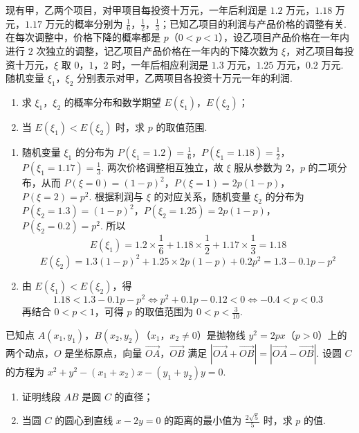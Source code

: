 \begin{problem}
现有甲，乙两个项目，对甲项目每投资十万元，一年后利润是 \(1.2\) 万元，\(1.18\) 万元，\(1.17\) 万元的概率分别为 \(\frac{1}{6}\)，\(\frac{1}{2}\)，\(\frac{1}{3}\)；已知乙项目的利润与产品价格的调整有关. 在每次调整中，价格下降的概率都是 \(p\)（\(0 < p < 1\)），设乙项目产品价格在一年内进行 \(2\) 次独立的调整，记乙项目产品价格在一年内的下降次数为 \(\xi\)，对乙项目每投资十万元，\(\xi\) 取 \(0\)，\(1\)，\(2\) 时，一年后相应利润是 \(1.3\) 万元，\(1.25\) 万元，\(0.2\) 万元. 随机变量 \(\xi_1\)，\(\xi_2\) 分别表示对甲，乙两项目各投资十万元一年的利润.

\begin{enumerate}
\item 求 \( \xi_1 \)，\( \xi_2 \) 的概率分布和数学期望 \( E(\xi_1) \)，\( E(\xi_2) \)；
\item 当 \( E(\xi_1) < E(\xi_2) \) 时，求 \(p\) 的取值范围.
\end{enumerate}
\end{problem}

\begin{solution}
\begin{enumerate}
\item 随机变量 \(\xi_1\) 的分布为
\(P(\xi_1=1.2)=\frac{1}{6}\)，\(P(\xi_1=1.18)=\frac{1}{2}\)，\(P(\xi_1=1.17)=\frac{1}{3}\).
两次价格调整相互独立，故 \(\xi\) 服从参数为 \(2\)，\(p\) 的二项分布，从而
\(P(\xi=0)=(1-p)^2\)，\(P(\xi=1)=2p(1-p)\)，\(P(\xi=2)=p^2\).
根据利润与 \(\xi\) 的对应关系，随机变量 \(\xi_2\) 的分布为
\(P(\xi_2=1.3)=(1-p)^2\)，\(P(\xi_2=1.25)=2p(1-p)\)，\(P(\xi_2=0.2)=p^2\).
所以
\[
E(\xi_1)=1.2\times\frac{1}{6}+1.18\times\frac{1}{2}+1.17\times\frac{1}{3}=1.18
\]
\[
E(\xi_2)=1.3(1-p)^2+1.25\times2p(1-p)+0.2p^2=1.3-0.1p-p^2
\]

\item 由 \(E(\xi_1)<E(\xi_2)\)，得
\[
1.18<1.3-0.1p-p^2
\Longleftrightarrow p^2+0.1p-0.12<0
\Longleftrightarrow -0.4<p<0.3
\]
再结合 \(0<p<1\)，可得 \(p\) 的取值范围为 \(0<p<\frac{3}{10}\).
\end{enumerate}
\end{solution}

\begin{problem}
已知点 \(A(x_{1},y_{1})\)，\(B(x_{2},y_{2})\)（\(x_{1}\)，\(x_{2}\neq 0\)）是抛物线 \(y^{2} = 2px\)（\(p > 0\)）上的两个动点，\(O\) 是坐标原点，向量 \(\overrightarrow{OA}\)，\(\overrightarrow{OB}\) 满足 \(\left|\overrightarrow{OA} +\overrightarrow{OB}\right| = \left|\overrightarrow{OA} -\overrightarrow{OB}\right|\). 设圆 \(C\) 的方程为 \(x^{2} + y^{2} - (x_{1} + x_{2})x - (y_{1} + y_{2})y = 0\).

\begin{enumerate}
\item 证明线段 \(AB\) 是圆 \(C\) 的直径；
\item 当圆 \(C\) 的圆心到直线 \(x - 2y = 0\) 的距离的最小值为 \(\frac{2\sqrt{5}}{5}\) 时，求 \(p\) 的值.
\end{enumerate}
\end{problem}

